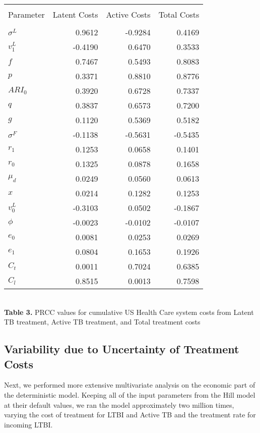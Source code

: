 \documentclass{article}[11pt]
\begin{document}
\begin{table}
\centering
\begin{tabular}{l r r r}
\hline\hline\\
Parameter & Latent Costs & Active Costs & Total Costs\\ [0.5ex]
\hline\\
$\sigma^{L}$  & 0.9612  & -0.9284 & 0.4169 \\
$v^{L}_{1}$   & -0.4190 & 0.6470  & 0.3533 \\
$f$                 & 0.7467  & 0.5493  & 0.8083 \\
$p$                & 0.3371  & 0.8810  & 0.8776 \\
$ARI_{0}$      & 0.3920  & 0.6728  & 0.7337 \\
$q$                & 0.3837  & 0.6573  & 0.7200 \\
$g$                & 0.1120  & 0.5369  & 0.5182 \\
$\sigma^{F}$ & -0.1138 & -0.5631 &-0.5435 \\
$r_{1}$          & 0.1253 &  0.0658  & 0.1401 \\
$r_{0}$          & 0.1325  & 0.0878  & 0.1658 \\
$\mu_{d}$      & 0.0249 & 0.0560  & 0.0613 \\
$x$                 & 0.0214 & 0.1282  & 0.1253 \\
$v^{L}_{0}$   & -0.3103 & 0.0502  &-0.1867 \\
$\phi$            & -0.0023 & -0.0102 &-0.0107 \\
$e_{0}$          & 0.0081 & 0.0253   & 0.0269 \\
$e_{1}$          & 0.0804 & 0.1653   & 0.1926 \\
$C_{t}$          & 0.0011 & 0.7024   & 0.6385 \\
$C_{l}$           & 0.8515 & 0.0013  & 0.7598 \\ [1ex]
\hline
\end{tabular}\\[1ex]

{\bf Table 3.} PRCC values for cumulative US Health Care system costs from 
Latent TB treatment, Active TB treatment, and Total treatment costs
\end{table}




\subsection{Variability due to Uncertainty of Treatment Costs}
Next, we performed more extensive multivariate analysis on the economic part of the deterministic model.  Keeping all of the input parameters from the Hill model at their default values, we ran the model approximately two million times, varying the cost of treatment for LTBI and Active TB and the treatment rate for incoming LTBI.  \\
\end{document}
